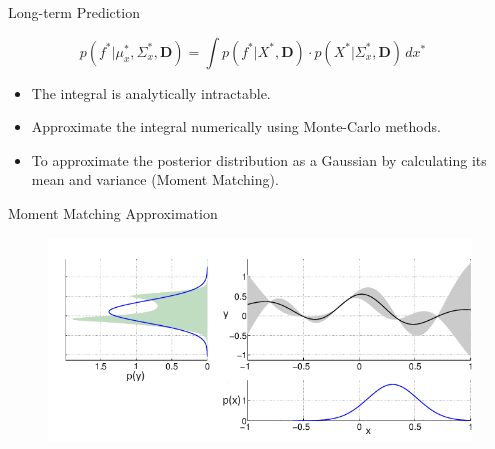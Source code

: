 

\begin{frame}{Long-term Prediction}

    \begin{equation}\label{eq:single_prediciton}
        p(f^*|\mu_x^*, \Sigma_x^* , \mathbf{D}) = \int p(f^*|X^*, \mathbf{D}) \cdot p(X^*|\Sigma_x^* , \mathbf{D}) \, dx^* \quad
    \end{equation}

    \begin{itemize}
        \item The integral is analytically intractable. %
        \item Approximate the integral numerically using Monte-Carlo methods. %
        \item To approximate the posterior distribution as a Gaussian by calculating its mean and variance (Moment Matching).

    \end{itemize}

\end{frame}

\begin{frame}{Moment Matching Approximation \cite{deisenroth2011pilco}}
    \begin{figure}
    \centering
    \includegraphics[width=1\linewidth]{figures/GP/MM_GP.png}
    \label{fig:mm}

\end{figure}
\end{frame}

